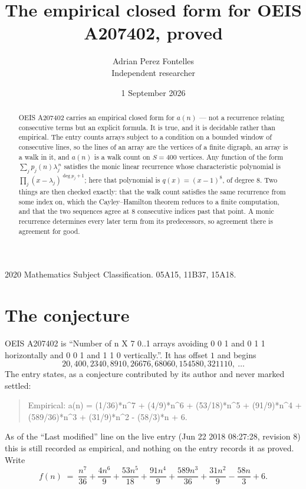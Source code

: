 \documentclass[11pt,a4paper]{article}
\title{The empirical closed form for OEIS A207402, proved}
\author{Adrian Perez Fontelles\\ \small Independent researcher}
\date{1 September 2026}
\theoremstyle{plain}
\theoremstyle{definition}
\begin{document}
\maketitle

\begin{abstract}
OEIS A207402 carries an empirical closed form for $a(n)$ --- not a recurrence relating
consecutive terms but an explicit formula. It is true, and it is decidable rather than
empirical. The entry counts arrays subject to a condition on a bounded window of consecutive lines, so the lines of an array are the
vertices of a finite digraph, an array is a walk in it, and $a(n)$ is a walk count on
$S=400$ vertices. Any function of the form $\sum_j p_j(n)\lambda_j^{\,n}$ satisfies the
monic linear recurrence whose characteristic polynomial is
$\prod_j(x-\lambda_j)^{\deg p_j+1}$; here that polynomial is $q(x)=(x-1)^{8}$, of degree
$8$. Two things are then checked exactly: that the walk count satisfies the same
recurrence from some index on, which the Cayley--Hamilton theorem reduces to a finite
computation, and that the two sequences agree at $8$ consecutive indices past that
point. A monic recurrence determines every later term from its predecessors, so agreement
there is agreement for good.
\end{abstract}

\noindent\small 2020 Mathematics Subject Classification. 05A15, 11B37, 15A18.\normalsize

\section{The conjecture}

OEIS A207402 is ``Number of n X 7 0..1 arrays avoiding 0 0 1 and 0 1 1 horizontally and 0 0 1 and 1 1 0 vertically.''. It has offset $1$ and begins
\[
20, 400, 2340, 8910, 26676, 68060, 154580, 321110,\ \dots
\]
The entry states, as a conjecture contributed by its author and never marked settled:
\begin{quote}
Empirical: a(n) = (1/36)*n\^{}7 + (4/9)*n\^{}6 + (53/18)*n\^{}5 + (91/9)*n\^{}4 + (589/36)*n\^{}3 + (31/9)*n\^{}2 - (58/3)*n + 6.
\end{quote}
As of the ``Last modified'' line on the live entry (Jun 22 2018 08:27:28, revision 8) this is still
recorded as empirical, and nothing on the entry records it as proved. Write
\[
f(n)\;=\;\frac{n^{7}}{36} + \frac{4 n^{6}}{9} + \frac{53 n^{5}}{18} + \frac{91 n^{4}}{9} + \frac{589 n^{3}}{36} + \frac{31 n^{2}}{9} - \frac{58 n}{3} + 6.
\]
\end{document}
